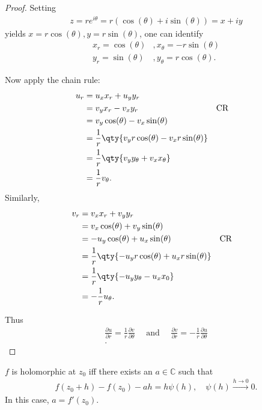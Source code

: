 \begin{proof}

Setting
\begin{align*}
z = re^{i\theta} = r(\cos(\theta) + i\sin(\theta) ) = x+iy
\end{align*}
yields \(x=r\cos(\theta), y=r\sin(\theta)\), one can identify
\begin{align*}
x_r = \cos(\theta)&, x_\theta = -r\sin(\theta) \\
y_r = \sin(\theta)&, y_\theta = r\cos(\theta)
.\end{align*}

Now apply the chain rule:
\begin{align*}
u_r 
&= u_x x_r + u_y y_r \\
&= v_y x_r -v_x y_r && \text{CR}\\
&= v_y \cos(\theta) - v_x \sin(\theta) \\
&= {1\over r}\qty{ v_y r\cos(\theta) - v_x r\sin(\theta) } \\
&= {1\over r}\qty { v_y y_\theta + v_x x_\theta} \\
&= {1\over r} v_\theta
.\end{align*}
Similarly,
\begin{align*}
v_r
&= v_x x_r + v_y y_r \\
&= v_x \cos(\theta) + v_y\sin(\theta) \\
&= -u_y\cos(\theta) + u_x\sin(\theta) && \text{CR} \\
&= {1\over r}\qty{ -u_y r\cos(\theta) + u_x r\sin(\theta)} \\
&= {1\over r}\qty{ -u_y y_\theta - u_x x_0 } \\
&= -{1\over r} u_\theta
.\end{align*}

Thus
\begin{align*}
\frac{\partial u}{\partial r}=\frac{1}{r} \frac{\partial v}{\partial \theta} \quad \text { and } \quad \frac{\partial v}{\partial r}=-\frac{1}{r} \frac{\partial u}{\partial \theta} \\
.\end{align*}

\end{proof}

\begin{proposition}

\(f\) is holomorphic at \(z_0\) iff there exists an
\(a\in {\mathbb{C}}\) such that
\begin{align*}  
f(z_0 + h) - f(z_0) - ah = h \psi(h), \quad \psi(h) \overset{h\to 0}\to 0
.\end{align*}
In this case, \(a = f'(z_0)\).

\end{proposition}

